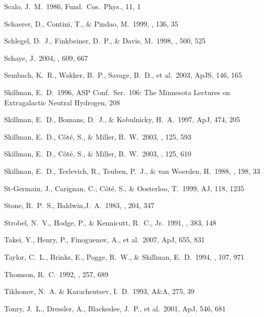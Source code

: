 \documentclass[12pt,onecolumn]{emulateapj}
\begin{document}
\begin{thebibliography}{}
Scalo, J.~M.\ 1986, Fund.\ Cos.\ Phys., 11, 1

Schaerer, D., Contini, T., \& Pindao, M.\ 1999, \aaps, 136, 35 

Schlegel, D.~J., Finkbeiner, D.~P., \& Davis, M.\ 1998, \apj , 500, 525

Schaye, J.\ 2004, \apj, 609, 667 

Sembach, K.~R.,  Wakker, B.~P., Savage, B.~D., et al.\ 2003, ApJS, 146, 165

Skillman, E.~D.\ 1996, ASP Conf.~Ser.~106: 
The Minnesota Lectures on Extragalactic Neutral Hydrogen, 208 

Skillman, E.~D., Bomans, D.~J., \& Kobulnicky, H.~A.\ 1997, ApJ, 474, 205

Skillman, E.~D., C{\^o}t{\'e}, S., \& Miller, B.~W.\ 2003, \aj, 125, 593

Skillman, E.~D., C{\^o}t{\'e}, S., \& Miller, B.~W.\ 2003, \aj, 125, 610 

Skillman, E.~D., Terlevich, R., Teuben, P.~J., \& van Woerden, H.\ 1988, \aap, 198, 33 

St-Germain, J., Carignan, C., C\^ot\'e, S., \& Oosterloo, T.\ 1999, AJ, 118, 1235

Stone, R.~P.~S., Baldwin,J.~A.\ 1983, \mnras, 204, 347

Strobel, N.~V., Hodge, P., \& Kennicutt, R.~C., Jr.\ 1991, \apj, 383, 148 

Takei, Y., Henry, P., Finoguenov, A., et al.\ 2007, ApJ, 655, 831 

Taylor, C.~L., Brinks, E., Pogge, R.~W., \& Skillman, E.~D.\ 1994, \aj, 107, 971 

Thomson, R.~C.\ 1992, \mnras, 257, 689 

Tikhonov, N.~A. \& Karachentsev, I.~D.\ 1993, A\&A, 275, 39

Tonry, J.~L., Dressler, A., Blackeslee, J.~P., et al.\ 2001, ApJ, 546, 681


\end{thebibliography}
\end{document}

